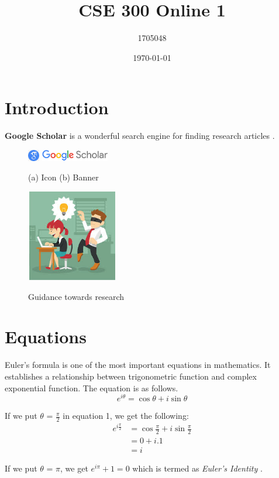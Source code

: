 \documentclass[14pt]{article}
\title{CSE 300 Online 1}
\author{1705048}
\date{\today}
\begin{document}
\maketitle
\tableofcontents
\pagebreak
\section{Introduction}
\textbf{Google Scholar} is a wonderful search engine for finding research articles \cite{dirac}.
\begin{figure}[h]
	\centering
	\includegraphics[width=0.5cm,height=0.5cm,scale=0.4]{gs_icon.png}
	\includegraphics[width=3cm,height=0.5cm,scale=0.4]{gs_page.png}
	
	(a) Icon   (b) Banner
	
	\includegraphics[width=4cm,height=4cm,scale=0.4]{plag.jpg}
	\label{fig:1}
	\caption{Guidance towards research}
\end{figure}
\section{Equations}
Euler’s formula is one of the most important equations in mathematics. It establishes a relationship between trigonometric function and complex exponential function. The equation is as follows.
\begin{equation}
e^{i\theta}=\cos\theta + i\sin\theta
\end{equation}\par
If we put $\theta$ = $\frac{\pi}{2}$ in equation 1, we get the following:
$$\begin{aligned}
e^{i{\frac{\pi}{2}}}&=\cos\frac{\pi}{2}+i\sin\frac{\pi}{2} \\
&=0+i.1 \\
&=i
\end{aligned}$$\par
If we put $\theta$ = $\pi$, we get $e^{i\pi}+1 = 0$ which is termed as \textit{Euler’s Identity} \cite{einstein}.
\end{document}
